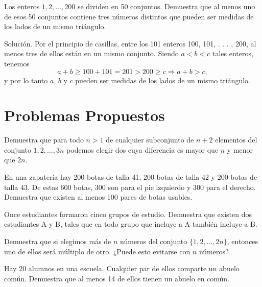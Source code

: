 \documentclass[11pt]{scrartcl}
\begin{document}
\begin{example}
    Los enteros \(1, 2, \ldots , 200\) se dividen en 50 conjuntos. Demuestra que al menos uno de esos 50 conjuntos contiene tres números distintos que pueden ser medidas de los lados de un mismo triángulo.    
\end{example}
Solución. Por el principio de casillas, entre los 101 enteros 100, 101, . . . , 200, al menos tres de ellos están en un mismo conjunto. Siendo \(a < b < c\) tales enteros, tenemos
\[ a + b \geq 100 + 101 = 201 > 200 \geq c \Rightarrow a + b > c, \]
y por lo tanto \(a\), \(b\) y \(c\) pueden ser medidas de los lados de un mismo triángulo.


\section{Problemas Propuestos}
\begin{problem}
Demuestra que para todo \(n > 1\) de cualquier subconjunto de \(n + 2\) elementos del conjunto \(1, 2, \ldots, 3n\) podemos elegir dos cuya diferencia es mayor que \(n\) y menor que \(2n\).
\end{problem}

\begin{problem}
En una zapatería hay 200 botas de talla 41, 200 botas de talla 42 y 200 botas de talla 43. De estas 600 botas, 300 son para el pie izquierdo y 300 para el derecho. Demuestra que existen al menos 100 pares de botas usables.
\end{problem}

\begin{problem}
Once estudiantes formaron cinco grupos de estudio. Demuestra que existen dos estudiantes A y B, tales que en todo grupo que incluye a A también incluye a B.
\end{problem}

\begin{problem}
Demuestra que si elegimos más de \(n\) números del conjunto \(\{1, 2, \ldots, 2n\}\), entonces uno de ellos será múltiplo de otro. ¿Puede esto evitarse con \(n\) números?
\end{problem}

\begin{problem}
Hay 20 alumnos en una escuela. Cualquier par de ellos comparte un abuelo común. Demuestra que al menos 14 de ellos tienen un abuelo en común.
\end{problem}
\end{document}
